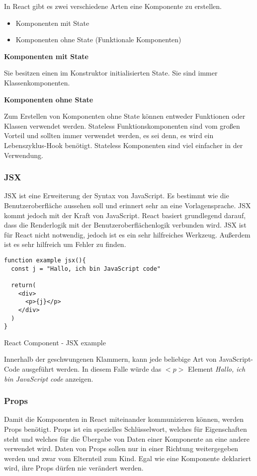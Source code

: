 In React gibt es zwei verschiedene Arten eine Komponente zu erstellen.
\begin{itemize}
  \item Komponenten mit State
  \item Komponenten ohne State (Funktionale Komponenten)\\
\end{itemize}

\centerline{\textbf{Komponenten mit State}}
Sie besitzen einen im Konstruktor initialisierten State. Sie sind immer Klassenkomponenten.\\

\centerline{\textbf{Komponenten ohne State}}
Zum Erstellen von Komponenten ohne State können entweder Funktionen oder Klassen verwendet werden.
Stateless Funktionskomponenten sind vom großen Vorteil und sollten immer verwendet werden, es sei 
denn, es wird ein Lebenszyklus-Hook benötigt. Stateless Komponenten sind viel einfacher in der
Verwendung.\cite{KompState} 

\subsubsection{JSX}
\label{jsx}
JSX ist eine Erweiterung der Syntax von JavaScript. Es bestimmt wie die Benutzeroberfläche aussehen soll
und erinnert sehr an eine Vorlagensprache. JSX kommt jedoch mit der Kraft von JavaScript. React basiert 
grundlegend darauf, dass die Renderlogik mit der Benutzeroberflächenlogik verbunden wird. JSX ist 
für React nicht notwendig, jedoch ist es ein sehr hilfreiches Werkzeug. 
Außerdem ist es sehr hilfreich um Fehler zu finden.
\begin{code}[htp]
\begin{lstlisting}
function example jsx(){
  const j = "Hallo, ich bin JavaScript code"

  return(
    <div>
      <p>{j}</p>
    </div>
  )
}
\end{lstlisting}
\caption{React Component - JSX example }
\end{code}
Innerhalb der geschwungenen Klammern, kann jede beliebige Art von JavaScript-Code ausgeführt werden.
In diesem Falle würde das $<p>$ Element \textit{Hallo, ich bin JavaScript code} anzeigen.
~\cite{JSX}

\subsubsection{Props}

 Damit die Komponenten in React miteinander kommunizieren können, werden Props benötigt. Props ist ein
 spezielles Schlüsselwort, welches für Eigenschaften steht und welches für die Übergabe von 
 Daten einer Komponente an eine andere verwendet wird. Daten von Props sollen nur in einer 
 Richtung weitergegeben werden und zwar vom Elternteil zum Kind. Egal wie eine Komponente 
 deklariert wird, ihre Props dürfen nie verändert werden.\\

